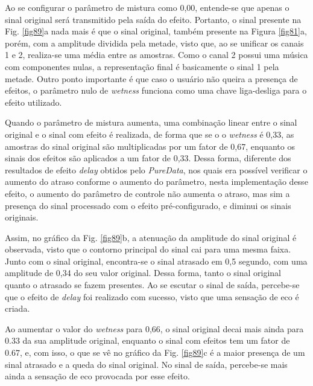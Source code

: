 Ao se configurar o parâmetro de mistura como 0,00, entende-se que apenas o sinal original será transmitido pela saída do efeito. Portanto, o sinal presente na Fig. \ref{fig89}a nada mais é que o sinal original, também presente na Figura \ref{fig81}a, porém, com a amplitude dividida pela metade, visto que, ao se unificar os canais 1 e 2, realiza-se uma média entre as amostras. Como o canal 2 possui uma música com componentes nulas, a representação final é basicamente o sinal 1 pela metade. Outro ponto importante é que caso o usuário não queira a presença de efeitos, o parâmetro nulo de \textit{wetness} funciona como uma chave liga-desliga para o efeito utilizado. 


Quando o parâmetro de mistura aumenta, uma combinação linear entre o sinal original e o sinal com efeito é realizada, de forma que se o o \textit{wetness} é 0,33, as amostras do sinal original são multiplicadas por um fator de 0,67, enquanto os sinais dos efeitos são aplicados a um fator de 0,33. Dessa forma, diferente dos resultados de efeito \textit{delay} obtidos pelo \textit{PureData}, nos quais era possível verificar o aumento do atraso conforme o aumento do parâmetro, nesta implementação desse efeito, o aumento do parâmetro de controle não aumenta o atraso, mas sim a presença do sinal processado com o efeito pré-configurado, e diminui os sinais originais. 

Assim, no gráfico da Fig. \ref{fig89}b, a atenuação da amplitude do sinal original é observada, visto que o contorno principal do sinal cai para uma mesma faixa. Junto com o sinal original, encontra-se o sinal atrasado em 0,5 segundo, com uma amplitude de 0,34 do seu valor original. Dessa forma, tanto o sinal original quanto o atrasado se fazem presentes. Ao se escutar o sinal de saída, percebe-se que o efeito de \textit{delay} foi realizado com sucesso, visto que uma sensação de eco é criada. 


Ao aumentar o valor do \textit{wetness} para 0,66, o sinal original decai mais ainda para 0.33 da sua amplitude original, enquanto o sinal com efeitos tem um fator de 0.67, e, com isso, o que se vê no gráfico da Fig. \ref{fig89}c é a maior presença de um sinal atrasado e a queda do sinal original. No sinal de saída, percebe-se mais ainda a sensação de eco provocada por esse efeito.

